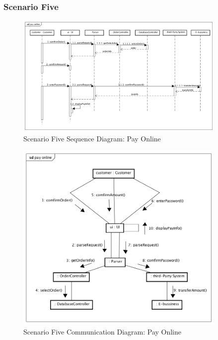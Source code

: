 \documentclass[12pt]{scrreprt}
\begin{document}
\subsubsection{Scenario Five}
\begin{figure}[H]
  \centering\includegraphics[width=4in]{DocumentRes/5SequenceDiagram_payOnline.png}
  \caption{Scenario Five Sequence Diagram: Pay Online}
\end{figure}
\begin{figure}[H]
  \centering\includegraphics[width=4in]{DocumentRes/5CommunicationDiagram_payOnline.png}
  \caption{Scenario Five Communication Diagram: Pay Online}
\end{figure}
\end{document}
